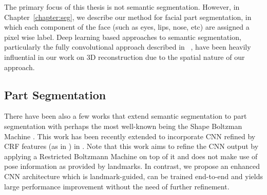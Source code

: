 The primary focus of this thesis is not semantic
segmentation. However, in Chapter~\ref{chapter:seg}, we describe our
method for facial part segmentation, in which each component of the
face (such as eyes, lips, nose, etc) are assigned a pixel wise
label. Deep learning based approaches to semantic segmentation,
particularly the fully convolutional approach described in
~\cite{long2015fully}, have been heavily influential in our work on 3D
reconstruction due to the spatial nature of our approach.





\subsection{Part Segmentation}

There have been also a few works that
extend semantic segmentation to part segmentation with perhaps the
most well-known being the Shape Boltzman Machine
\cite{eslami2012generative,eslami2014shape}. This work has been
recently extended to incorporate CNN refined by CRF features (as in
\cite{chen2015semantic}) in \cite{tsogkas2015deep}. Note that this
work aims to refine the CNN output by applying a Restricted Boltzmann
Machine on top of it and does not make use of pose information as
provided by landmarks. In contrast, we propose an enhanced CNN
architecture which is landmark-guided, can be trained end-to-end and
yields large performance improvement without the need of further
refinement.


